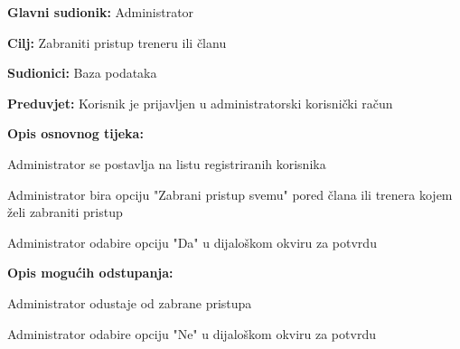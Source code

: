 		\noindent {}
		\begin{packed_item}
		
			\item \textbf{Glavni sudionik: } Administrator
			\item  \textbf{Cilj: } Zabraniti pristup treneru ili članu
			\item  \textbf{Sudionici: } Baza podataka
			\item  \textbf{Preduvjet: } Korisnik je prijavljen u administratorski korisnički račun
			\item  \textbf{Opis osnovnog tijeka:}
		
			\item[] \begin{packed_enum}
			
				\item Administrator se postavlja na listu registriranih korisnika
				\item Administrator bira opciju "Zabrani pristup svemu" pored člana ili trenera kojem želi zabraniti pristup
				\item Administrator odabire opciju "Da" u dijaloškom okviru za potvrdu
			\end{packed_enum}
		
			\item  \textbf{Opis mogućih odstupanja:}
		
			\item[] \begin{packed_item}
			
				\item[2.a] Administrator odustaje od zabrane pristupa
				\item[] \begin{packed_enum}
				
					\item Administrator odabire opciju "Ne" u dijaloškom okviru za potvrdu
				
				\end{packed_enum}
			\end{packed_item}
		
		\end{packed_item}

